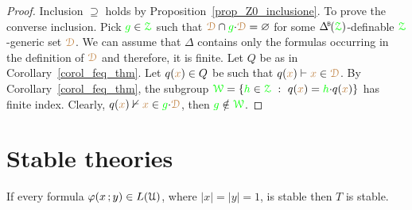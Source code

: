 \begin{proof}
  Inclusion $\supseteq$ holds by Proposition~\ref{prop_Z0_inclusione}.
  To prove the converse inclusion.
  Pick ${\color{green} g}\in{\color{green}\EuScript Z}$ such that ${\color{brown}\EuScript D}\cap{\color{green}g}{\cdot}{\color{brown}\EuScript D}=\varnothing$ for some $\BDelta(\grZ)$-definable ${\color{green}\EuScript Z}$-generic set ${\color{brown}\EuScript D}$.
  We can assume that $\Delta$ contains only the formulas occurring in the definition of ${\color{brown}\EuScript D}$ and therefore, it is finite.
  Let $Q$ be as in Corollary~\ref{corol_feq_thm}.
  Let $q({\color{brown} x})\in Q$ be such that $q({\color{brown} x})\vdash{\color{brown}x}\in{\color{brown}\EuScript D}$.
  By Corollary~\ref{corol_feq_thm}, the subgroup ${\color{green}\EuScript W}=\{{\color{green} h}\in{\color{green}\EuScript Z}\ :\ q({\color{brown} x})={\color{green} h}{\cdot}q({\color{brown} x})\}$ has finite index.
  Clearly, $q({\color{brown} x})\nvdash{\color{brown}x}\in{\color{green}g}{\cdot}{\color{brown}\EuScript D}$, then ${\color{green} g}\notin{\color{green}\EuScript W}$.
\end{proof}






\section{Stable theories}
\label{stable_theories}

\def\medrel#1{\parbox[t]{6ex}{$\displaystyle\hfil #1$}}
\def\ceq#1#2#3{\parbox{15ex}{$\displaystyle #1$}\medrel{#2}$\displaystyle  #3$}

\begin{theorem}
  If every formula $\varphi(x\,;y)\in L(\EuScript U)$, where $|x|=|y|=1$, is stable then $T$ is stable.
\end{theorem}

